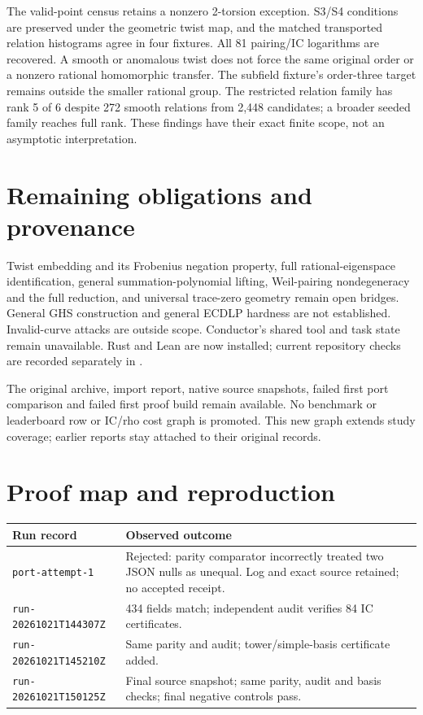 \documentclass[10pt]{article}
\begin{document}
The valid-point census retains a nonzero 2-torsion exception. S3/S4 conditions
are preserved under the geometric twist map, and the matched transported
relation histograms agree in four fixtures. All 81 pairing/IC logarithms are
recovered. A smooth or anomalous twist does not force the same original order
or a nonzero rational homomorphic transfer. The subfield fixture's order-three
target remains outside the smaller rational group. The restricted relation
family has rank 5 of 6 despite 272 smooth relations from 2,448 candidates;
a broader seeded family reaches full rank. These findings have their exact
finite scope, not an asymptotic interpretation.

\section*{Remaining obligations and provenance}
Twist embedding and its Frobenius negation property, full rational-eigenspace
identification, general summation-polynomial lifting, Weil-pairing
nondegeneracy and the full reduction, and universal trace-zero geometry remain
open bridges. General GHS construction and general ECDLP hardness are not
established. Invalid-curve attacks are outside scope. Conductor's shared tool
and task state remain unavailable. Rust and Lean are now installed; current
repository checks are recorded separately in .

The original archive, import report, native source snapshots, failed first
port comparison and failed first proof build remain available. No benchmark
or leaderboard row or IC/rho cost graph is promoted. This new graph extends
study coverage; earlier reports stay attached to their original records.

\newpage
\section*{Proof map and reproduction}
\begin{center}\small
\begin{tabular}{lp{3.9in}}
\toprule
Run record & Observed outcome \\\midrule
\texttt{port-attempt-1} & Rejected: parity comparator incorrectly treated two JSON nulls as unequal. Log and exact source retained; no accepted receipt. \\
\texttt{run-20261021T144307Z} & 434 fields match; independent audit verifies 84 IC certificates. \\
\texttt{run-20261021T145210Z} & Same parity and audit; tower/simple-basis certificate added. \\
\texttt{run-20261021T150125Z} & Final source snapshot; same parity, audit and basis checks; final negative controls pass. \\
\bottomrule
\end{tabular}\normalsize\end{center}
\end{document}
